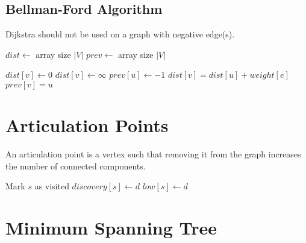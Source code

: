 \documentclass{report}
\begin{document}
\subsection{Bellman-Ford Algorithm}

Dijkstra should not be used on a graph with negative edge(s).

\noindent \hrulefill
\begin{algorithmic}[1]
   
    \State $dist \gets$ array size $|V|$
    \State $prev \gets$ array size $|V|$

        $dist[v] \gets 0$
      \EndIf
        $dist[v] \gets \infty$
      \EndIf
      \State $prev[u] \gets -1$
    \EndFor
       
          \State $dist[v] = dist[u] + weight[e]$
          \State $prev[v] = u$
        \EndIf
      \EndFor
    \EndFor
     
        \State {}
        \State \Return{}
      \EndIf
    \EndFor
  \EndFunction
\end{algorithmic}
\noindent \hrulefill

\section{Articulation Points}

An articulation point is a vertex such that removing it from the graph increases the number of connected components.

\noindent \hrulefill
\begin{algorithmic}[1]
   
  \State Mark $s$ as visited
  \State $discovery[s] \gets d$
  \State $low[s] \gets d$
  \EndFunction
\end{algorithmic}
\noindent \hrulefill

\section{Minimum Spanning Tree}
\end{document}
